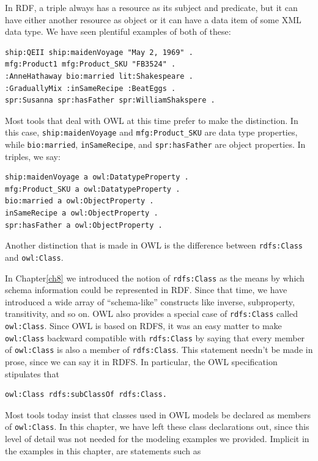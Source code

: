In RDF, a triple always has a resource as its subject and predicate, but
it can have either another
resource as object or it can have a data item of some XML data type. We
have seen plentiful examples of both of these:

\begin{lstlisting}
ship:QEII ship:maidenVoyage "May 2, 1969" .
mfg:Product1 mfg:Product_SKU "FB3524" .
:AnneHathaway bio:married lit:Shakespeare .
:GraduallyMix :inSameRecipe :BeatEggs .
spr:Susanna spr:hasFather spr:WilliamShakspere .
\end{lstlisting}

Most tools that deal with OWL at this time prefer to make the
distinction. In this case, \texttt{ship:maidenVoyage} and \texttt{mfg:Product\_SKU} are
data type properties, while \texttt{bio:married}, \texttt{inSameRecipe}, and \texttt{spr:hasFather}
are object properties. In triples, we say:

\begin{lstlisting}
ship:maidenVoyage a owl:DatatypeProperty .
mfg:Product_SKU a owl:DatatypeProperty .
bio:married a owl:ObjectProperty .
inSameRecipe a owl:ObjectProperty .
spr:hasFather a owl:ObjectProperty .
\end{lstlisting}

Another distinction that is made in OWL is the difference between
\texttt{rdfs:Class} and \texttt{owl:Class}.

In Chapter\ref{ch8} we introduced the notion of \texttt{rdfs:Class} as the means by
which schema information could be represented in RDF. Since that time,
we have introduced a wide array of ``schema-like'' constructs like
inverse, subproperty, transitivity, and so on. OWL also provides a
special case of \texttt{rdfs:Class} called \texttt{owl:Class}. Since OWL is based on RDFS,
it was an easy matter to make \texttt{owl:Class} backward compatible with
\texttt{rdfs:Class} by saying that every member of \texttt{owl:Class} is also a member of
\texttt{rdfs:Class}. This statement needn't be made in prose, since we can say it
in RDFS. In particular, the OWL specification stipulates that

\begin{lstlisting}
owl:Class rdfs:subClassOf rdfs:Class.
\end{lstlisting}

Most tools today insist that classes used in OWL models be declared as
members of \texttt{owl:Class}. In this chapter, we have left these class
declarations out, since this level of detail was not needed for the
modeling examples we provided. Implicit in the examples in this chapter,
are statements such as

